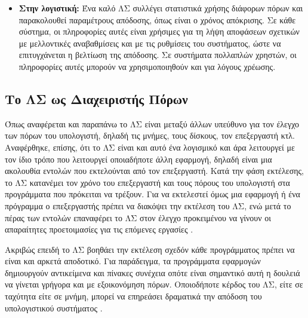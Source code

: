 \begin{itemize}
	\item \textbf{Στην λογιστική:} Ένα καλό ΛΣ συλλέγει στατιστικά χρήσης διάφορων πόρων και παρακολουθεί παραμέτρους απόδοσης, όπως είναι ο χρόνος απόκρισης. Σε κάθε σύστημα, οι πληροφορίες αυτές είναι χρήσιμες για τη λήψη αποφάσεων σχετικών με μελλοντικές αναβαθμίσεις και με τις ρυθμίσεις του συστήματος, ώστε να επιτυγχάνεται η βελτίωση της απόδοσης. Σε συστήματα πολλαπλών χρηστών, οι πληροφορίες αυτές μπορούν να χρησιμοποιηθούν και για λόγους χρέωσης.
\end{itemize}
\subsection{Το ΛΣ ως Διαχειριστής Πόρων}
Όπως αναφέρεται και παραπάνω το ΛΣ είναι μεταξύ άλλων υπεύθυνο για τον έλεγχο των πόρων του υπολογιστή, δηλαδή τις μνήμες, τους δίσκους, τον επεξεργαστή κτλ. Αναφέρθηκε, επίσης, ότι το ΛΣ είναι και αυτό ένα λογισμικό και άρα λειτουργεί με τον ίδιο τρόπο που λειτουργεί οποιαδήποτε άλλη εφαρμογή, δηλαδή είναι μια ακολουθία εντολών που εκτελούνται από τον επεξεργαστή. Κατά την φάση εκτέλεσης, το ΛΣ κατανέμει τον χρόνο του επεξεργαστή και τους πόρους του υπολογιστή στα προγράμματα που πρόκειται να τρέξουν. Για να εκτελεστεί όμως μια εφαρμογή ή ένα πρόγραμμα ο επεξεργαστής πρέπει να διακόψει την εκτέλεση του ΛΣ, ενώ μετά το πέρας των εντολών επαναφέρει το ΛΣ στον έλεγχο προκειμένου να γίνουν οι απαραίτητες προετοιμασίες για τις επόμενες εργασίες \cite{stallings}.

Ακριβώς επειδή το ΛΣ βοηθάει την εκτέλεση σχεδόν κάθε προγράμματος πρέπει να είναι και αρκετά αποδοτικό. Για παράδειγμα, τα προγράμματα εφαρμογών δημιουργούν αντικείμενα και πίνακες συνέχεια οπότε είναι σημαντικό αυτή η δουλειά να γίνεται γρήγορα και με εξοικονόμηση πόρων. Οποιοδήποτε κέρδος του ΛΣ, είτε σε ταχύτητα είτε σε μνήμη, μπορεί να επηρεάσει δραματικά την απόδοση του υπολογιστικού συστήματος \cite{elements_of_computing}.